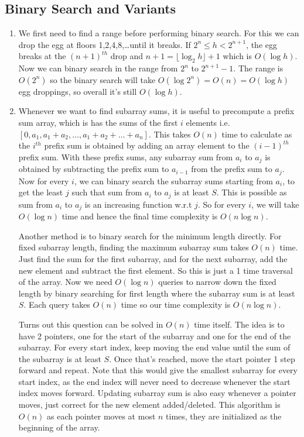 \documentclass[12pt]{report}
\begin{document}
\subsection*{\huge\bfseries Binary Search and Variants}
\begin{enumerate}[label=\textbf{\arabic*.}]

  \item We first need to find a range before performing binary search. For this we can drop the egg at 
  floors 1,2,4,8,\dots until it breaks. If $2^n \leq h < 2^{n+1}$, the egg breaks at the $(n+1)^{th}$
  drop and $n+1 = \lfloor \log_2 h \rfloor + 1$ which is $O(\log h)$. Now we can binary search in the range from
  $2^n$ to $2^{n+1}-1$. The range is $O(2^n)$ so the binary search will take $O(\log 2^n) = O(n) = O(\log h)$
  egg droppings, so overall it's still $O(\log h)$.

  \item Whenever we want to find subarray sums, it is useful to precompute a prefix sum array, which is
  has the sums of the first $i$ elements i.e. $[0, a_1, a_1+a_2, \dots, a_1+a_2+\dots+a_n]$. This takes 
  $O(n)$ time to calculate as the $i^{th}$ prefix sum is obtained by adding an array element to the $(i-1)^{th}$
  prefix sum. With these prefix sums, any subarray sum from $a_i$ to $a_j$ is obtained by subtracting the prefix
  sum to $a_{i-1}$ from the prefix sum to $a_j$. Now for every $i$, we can binary search the subarray sums
  starting from $a_i$, to get the least $j$ such that sum from $a_i$ to $a_j$ is at least $S$. This is 
  possible as sum from $a_i$ to $a_j$ is an increasing function w.r.t $j$. So for every $i$, we will take
  $O(\log n)$ time and hence the final time complexity is $O(n \log n)$.

  Another method is to binary search for the minimum length directly. For fixed subarray length, finding the
  maximum subarray sum takes $O(n)$ time. Just find the sum for the first subarray, and for the next subarray,
  add the new element and subtract the first element. So this is just a 1 time traversal of the array. Now we 
  need $O(\log n)$ queries to narrow down the fixed length by binary searching for first length where the subarray
  sum is at least $S$. Each query takes $O(n)$ time so our time complexity is $O(n \log n)$.

  Turns out this question can be solved in $O(n)$ time itself. The idea is to have 2 pointers, one for the start 
  of the subarray and one for the end of the subarray. For every start index, keep moving the end value until 
  the sum of the subarray is at least $S$. Once that's reached, move the start pointer 1 step forward and repeat. Note that 
  this would give the smallest subarray for every start index, as the end index will never need to decrease whenever 
  the start index moves forward. Updating subarray sum is also easy whenever a pointer moves, just correct for
  the new element added/deleted. This algorithm is $O(n)$ as each pointer moves at most $n$ times, they are initialized as 
  the beginning of the array.


\end{enumerate}
\end{document}
